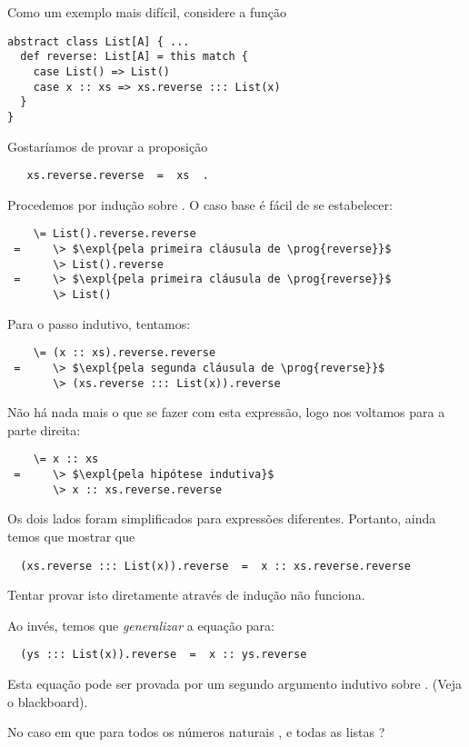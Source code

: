 {Como um exemplo mais dif\'{i}cil, considere a fun\c{c}\~{a}o
\begin{lstlisting}
abstract class List[A] { ...
  def reverse: List[A] = this match {
    case List() => List()
    case x :: xs => xs.reverse ::: List(x)
  }
}
\end{lstlisting}
Gostaríamos de provar a proposição 
\begin{lstlisting}
   xs.reverse.reverse  =  xs  .
\end{lstlisting}
Procedemos por indução sobre . O caso base é fácil de se estabelecer:
\begin{lstlisting}
    \= List().reverse.reverse
 =     \> $\expl{pela primeira cláusula de \prog{reverse}}$
       \> List().reverse
 =     \> $\expl{pela primeira cláusula de \prog{reverse}}$
       \> List()
\end{lstlisting}
\es\bs
Para o passo indutivo, tentamos:
\begin{lstlisting}
    \= (x :: xs).reverse.reverse
 =     \> $\expl{pela segunda cláusula de \prog{reverse}}$
       \> (xs.reverse ::: List(x)).reverse
\end{lstlisting}
Não há nada mais o que se fazer com esta expressão, logo nos voltamos para a parte direita:
\begin{lstlisting}
    \= x :: xs
 =     \> $\expl{pela hipótese indutiva}$
       \> x :: xs.reverse.reverse
\end{lstlisting}
Os dois lados foram simplificados para expressões diferentes.
Portanto, ainda temos que mostrar que 
\begin{lstlisting}
  (xs.reverse ::: List(x)).reverse  =  x :: xs.reverse.reverse
\end{lstlisting}
Tentar provar isto diretamente através de indução não funciona.

Ao invés, temos que {\em generalizar} a equação para:
\begin{lstlisting}
  (ys ::: List(x)).reverse  =  x :: ys.reverse
\end{lstlisting}
\es\bs
Esta equação pode ser provada por um segundo argumento indutivo sobre .
(Veja o blackboard).

\begin{exercise}
No caso em que  para todos os números naturais , 
 e todas as listas ?
\end{exercise}

\es
{}

}

